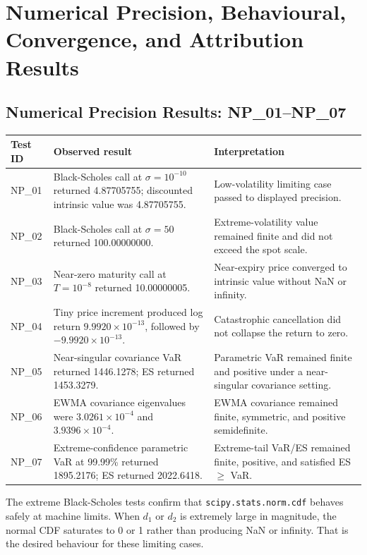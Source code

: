 \documentclass[11pt]{article}
\newcommand{\code}[1]{\texttt{#1}}
\begin{document}
\section{Numerical Precision, Behavioural, Convergence, and Attribution Results}
\label{sec:numerical-behavioural-results}

\subsection{Numerical Precision Results: NP\_01--NP\_07}

\begin{center}
\footnotesize
\begin{tabular}{L{1.7cm}L{5.2cm}L{6.2cm}}
\toprule
\textbf{Test ID} & \textbf{Observed result} & \textbf{Interpretation} \\
\midrule
NP\_01 & Black-Scholes call at $\sigma = 10^{-10}$ returned 4.87705755; discounted intrinsic value was 4.87705755. & Low-volatility limiting case passed to displayed precision. \\
NP\_02 & Black-Scholes call at $\sigma = 50$ returned 100.00000000. & Extreme-volatility value remained finite and did not exceed the spot scale. \\
NP\_03 & Near-zero maturity call at $T = 10^{-8}$ returned 10.00000005. & Near-expiry price converged to intrinsic value without NaN or infinity. \\
NP\_04 & Tiny price increment produced log return $9.9920 \times 10^{-13}$, followed by $-9.9920 \times 10^{-13}$. & Catastrophic cancellation did not collapse the return to zero. \\
NP\_05 & Near-singular covariance VaR returned 1446.1278; ES returned 1453.3279. & Parametric VaR remained finite and positive under a near-singular covariance setting. \\
NP\_06 & EWMA covariance eigenvalues were $3.0261 \times 10^{-4}$ and $3.9396 \times 10^{-4}$. & EWMA covariance remained finite, symmetric, and positive semidefinite. \\
NP\_07 & Extreme-confidence parametric VaR at 99.99\% returned 1895.2176; ES returned 2022.6418. & Extreme-tail VaR/ES remained finite, positive, and satisfied ES $\geq$ VaR. \\
\bottomrule
\end{tabular}
\end{center}

The extreme Black-Scholes tests confirm that \code{scipy.stats.norm.cdf}
behaves safely at machine limits.  When $d_1$ or $d_2$ is extremely large
in magnitude, the normal CDF saturates to 0 or 1 rather than producing
NaN or infinity.  That is the desired behaviour for these limiting cases.
\end{document}
